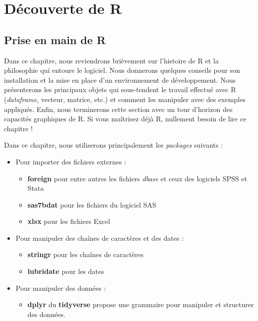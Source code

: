 \documentclass[
  11pt,
  french,
]{book}
\makeatletter
\providecommand{\tightlist}{%
  \setlength{\itemsep}{0pt}\setlength{\parskip}{0pt}}
\newenvironment{kframev}{%
\medskip{}
\setlength{\fboxsep}{.8em}
 \def\at@end@of@kframev{}%
 \ifinner\ifhmode%
  \def\at@end@of@kframev{\end{minipage}}%
  \begin{minipage}{\columnwidth}%
 \fi\fi%
 \def\FrameCommand##1{\hskip\@totalleftmargin \hskip-\fboxsep
 \colorbox{shadebluecolor}{##1}\hskip-\fboxsep
     \hskip-\linewidth \hskip-\@totalleftmargin \hskip\columnwidth}%
 \MakeFramed {\advance\hsize-\width
   \@totalleftmargin\z@ \linewidth\hsize
   \@setminipage}}%
 {\par\unskip\endMakeFramed%
 \at@end@of@kframev}
\newenvironment{rmdblock}[1]
  {
  \begin{itemize}
  \renewcommand{\labelitemi}{
    \raisebox{-.7\height}[0pt][0pt]{
      {\setkeys{Gin}{width=3em,keepaspectratio}\texttt{[image: images/\#1]}}
    }
  }
  \setlength{\fboxsep}{1em}
  \begin{kframev}
  \small
  \item
  }
  {
  \end{kframev}
  \end{itemize}
  }
\newenvironment{bloc_package}
  {\begin{rmdblock}{package}}
  {\end{rmdblock}}
\makeatother
\begin{document}
\hypertarget{part-duxe9couverte-de-r}{%
\part{Découverte de R}\label{part-duxe9couverte-de-r}}

\hypertarget{chap01}{%
\chapter{Prise en main de R}\label{chap01}}

Dans ce chapitre, nous reviendrons brièvement sur l'histoire de R et la philosophie qui entoure le logiciel. Nous donnerons quelques conseils pour son installation et la mise en place d'un environnement de développement. Nous présenterons les principaux objets qui sous-tendent le travail effectué avec R (\emph{dataframe}, vecteur, matrice, etc.) et comment les manipuler avec des exemples appliqués. Enfin, nous terminerons cette section avec un tour d'horizon des capacités graphiques de R. Si vous maîtrisez déjà R, nullement besoin de lire ce chapitre !

\begin{bloc_package}

Dans ce chapitre, nous utiliserons principalement les \emph{packages} suivants :

\begin{itemize}
\tightlist
\item
  Pour importer des fichiers externes :

  \begin{itemize}
  \tightlist
  \item
    \textbf{foreign} pour entre autres les fichiers \emph{dbase} et ceux des logiciels SPSS et Stata
  \item
    \textbf{sas7bdat} pour les fichiers du logiciel SAS
  \item
    \textbf{xlsx} pour les fichiers Excel
  \end{itemize}
\item
  Pour manipuler des chaînes de caractères et des dates :

  \begin{itemize}
  \tightlist
  \item
    \textbf{stringr} pour les chaînes de caractères
  \item
    \textbf{lubridate} pour les dates
  \end{itemize}
\item
  Pour manipuler des données :

  \begin{itemize}
  \tightlist
  \item
    \textbf{dplyr } du \textbf{tidyverse} propose une grammaire pour manipuler et structurer des données.
  \end{itemize}
\end{itemize}


\end{bloc_package}
\end{document}
